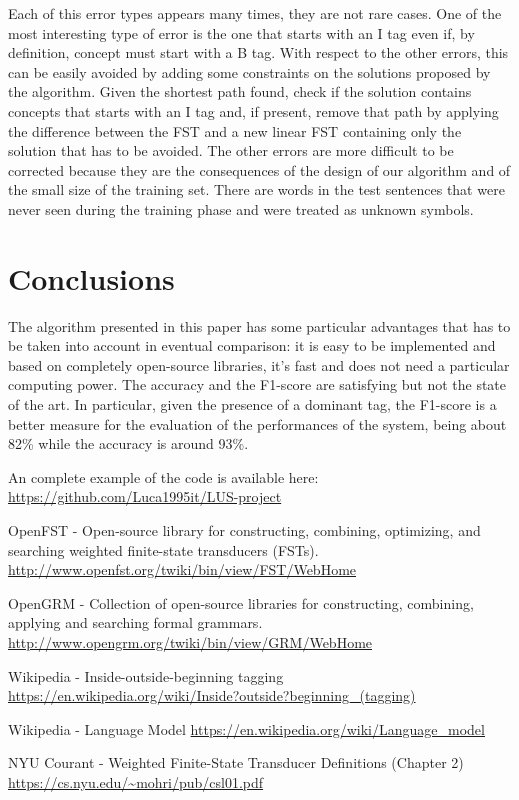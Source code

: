 \documentclass[11pt,a4paper]{article}
\begin{document}
Each of this error types appears many times, they are not rare cases. One of the most interesting type of error is the one that starts with an I tag even if, by definition, concept must start with a B tag. With respect to the other errors, this can be easily avoided by adding some constraints on the solutions proposed by the algorithm. Given the shortest path found, check if the solution contains concepts that starts with an I tag and, if present, remove that path by applying the difference between the FST and a new linear FST containing only the solution that has to be avoided.
The other errors are more difficult to be corrected because they are the consequences of the design of our algorithm and of the small size of the training set. There are words in the test sentences that were never seen during the training phase and were treated as unknown symbols.

\section{Conclusions}

The algorithm presented in this paper has some particular advantages that has to be taken into account in eventual comparison: it is easy to be implemented and based on completely open-source libraries, it's fast and does not need a particular computing power. The accuracy and the F1-score are satisfying but not the state of the art. In particular, given the presence of a dominant tag, the F1-score is a better measure for the evaluation of the performances of the system, being about 82\% while the accuracy is around 93\%.

An complete example of the code is available here: \url{https://github.com/Luca1995it/LUS-project}

\bigskip


\begin{thebibliography}{2}

OpenFST - Open-source library for constructing, combining, optimizing, and searching weighted finite-state transducers (FSTs). \\
\url{http://www.openfst.org/twiki/bin/view/FST/WebHome}

OpenGRM - Collection of open-source libraries for constructing, combining, applying and searching formal grammars.
\url{http://www.opengrm.org/twiki/bin/view/GRM/WebHome}

Wikipedia - Inside-outside-beginning tagging
\url{https://en.wikipedia.org/wiki/Inside?outside?beginning_(tagging)}

Wikipedia - Language Model
\url{https://en.wikipedia.org/wiki/Language_model}

NYU Courant - Weighted Finite-State Transducer Definitions (Chapter 2)
\url{https://cs.nyu.edu/~mohri/pub/csl01.pdf}


\end{thebibliography}
\end{document}
